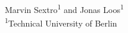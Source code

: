 \documentclass[a0,portrait]{a0poster}
\begin{document}
\begin{minipage}[b][][t]{\linewidth}
\vfill
\makeatletter
\centering{\fontsize{92pt}{100pt}\selectfont\color{primary}\textbf{{\@title}}\par}
\makeatother
\color{Black}
\vspace{1cm}
Marvin Sextro\textsuperscript{1} and Jonas Loos\textsuperscript{1}\\
\vspace{0.2cm}
\textsuperscript{1}Technical University of Berlin
\end{minipage}


\vspace{1cm}

\end{document}
